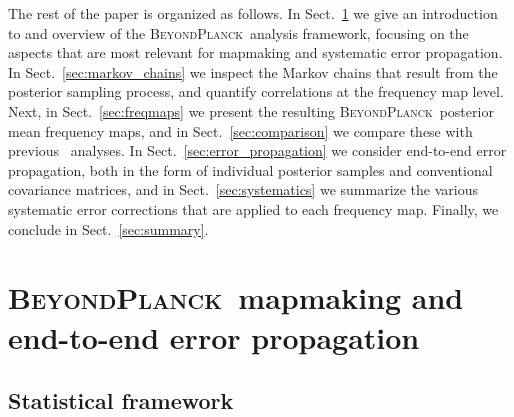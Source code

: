 \documentclass[twocolumn]{aa}
\newcommand{\BP}{\textsc{BeyondPlanck}}
\begin{document}
The rest of the paper is organized as follows. In Sect.~\ref{sec:bp}
we give an introduction to and overview of the \BP\ analysis
framework, focusing on the aspects that are most relevant for
mapmaking and systematic error propagation. In
Sect.~\ref{sec:markov_chains} we inspect the Markov chains that result
from the posterior sampling process, and quantify correlations at the
frequency map level. Next, in Sect.~\ref{sec:freqmaps} we present the
resulting \BP\ posterior mean frequency maps, and in
Sect.~\ref{sec:comparison} we compare these with previous
\Planck\ analyses. In Sect.~\ref{sec:error_propagation} we consider
end-to-end error propagation, both in the form of individual posterior
samples and conventional covariance matrices, and in
Sect.~\ref{sec:systematics} we summarize the various systematic error
corrections that are applied to each frequency map. Finally, we
conclude in Sect.~\ref{sec:summary}.




  \section{\BP\ mapmaking and end-to-end error propagation}
  \label{sec:bp}

\subsection{Statistical framework}  
  
\end{document}
